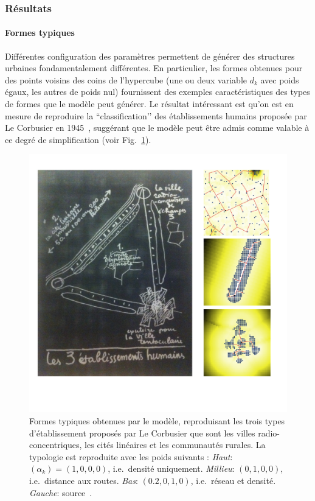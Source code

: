 \documentclass[french,12pt]{article}
\begin{document}
\subsubsection{Résultats}

\paragraph{Formes typiques}

Différentes configuration des paramètres permettent de générer des structures urbaines fondamentalement différentes. En particulier, les formes obtenues pour des points voisins des coins de l’hypercube (une ou deux variable $d_k$ avec poids égaux, les autres de poids nul) fournissent des exemples caractéristiques des types de formes que le modèle peut générer. Le résultat intéressant est qu’on est en mesure de reproduire la ``classification’’ des établissements humains proposée par Le Corbusier en 1945~\cite{mangin2004ville}, suggérant que le modèle peut être admis comme valable à ce degré de simplification (voir Fig.~\ref{fig_corbu}).



\begin{figure}
\centering
\includegraphics[trim=0mm 18mm 2mm 12mm, clip, width=\columnwidth]{figures/corbu}
\caption{\small Formes typiques obtenues par le modèle, reproduisant les trois types d’établissement proposés par Le Corbusier que sont les villes radio-concentriques, les cités linéaires et les communautés rurales. La typologie est reproduite avec les poids suivants : \emph{Haut}: $(\alpha_k)=(1,0,0,0)$, i.e.~densité uniquement. \emph{Millieu}: $(0,1,0,0)$, i.e.~distance aux routes. \emph{Bas}: $(0.2,0,1,0)$, i.e.~réseau et densité. \emph{Gauche}: source~\cite{mangin2004ville}.}
\label{fig_corbu}
\end{figure}
\end{document}
